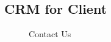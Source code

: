 \subsection{CRM for Client}
\begin{figure}[H]
	\begin{center}
		\caption{Contact Us}
		\label{fig:crm_client}
	\end{center}
\end{figure}
\newpage
